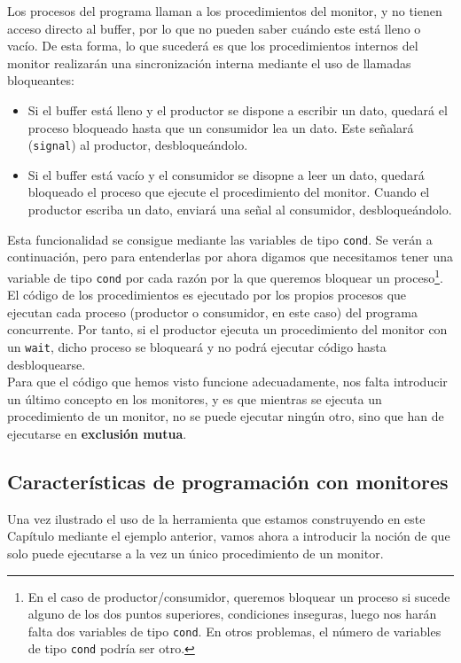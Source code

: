 \begin{ejemplo}
\begin{itemize}
    \end{itemize}
    Los procesos del programa llaman a los procedimientos del monitor, y no tienen acceso directo al buffer, por lo que no pueden saber cuándo este está lleno o vacío. De esta forma, lo que sucederá es que los procedimientos internos del monitor realizarán una sincronización interna mediante el uso de llamadas bloqueantes:
    \begin{itemize}
        \item Si el buffer está lleno y el productor se dispone a escribir un dato, quedará el proceso bloqueado hasta que un consumidor lea un dato. Este señalará (\verb|signal|) al productor, desbloqueándolo.
        \item Si el buffer está vacío y el consumidor se disopne a leer un dato, quedará bloqueado el proceso que ejecute el procedimiento del monitor. Cuando el productor escriba un dato, enviará una señal al consumidor, desbloqueándolo.
    \end{itemize}
    Esta funcionalidad se consigue mediante las variables de tipo \verb|cond|. Se verán a continuación, pero para entenderlas por ahora digamos que necesitamos tener una variable de tipo \verb|cond| por cada razón por la que queremos bloquear un proceso\footnote{En el caso de productor/consumidor, queremos bloquear un proceso si sucede alguno de los dos puntos superiores, condiciones inseguras, luego nos harán falta dos variables de tipo \texttt{cond}. En otros problemas, el número de variables de tipo \texttt{cond} podría ser otro.}.\\

    El código de los procedimientos es ejecutado por los propios procesos que ejecutan cada proceso (productor o consumidor, en este caso) del programa concurrente. Por tanto, si el productor ejecuta un procedimiento del monitor con un \verb|wait|, dicho proceso se bloqueará y no podrá ejecutar código hasta desbloquearse.\\

    Para que el código que hemos visto funcione adecuadamente, nos falta introducir un último concepto en los monitores, y es que mientras se ejecuta un procedimiento de un monitor, no se puede ejecutar ningún otro, sino que han de ejecutarse en \textbf{exclusión mutua}.
\end{ejemplo}

\subsection{Características de programación con monitores}
Una vez ilustrado el uso de la herramienta que estamos construyendo en este Capítulo mediante el ejemplo anterior, vamos ahora a introducir la noción de que solo puede ejecutarse a la vez un único procedimiento de un monitor.\\

